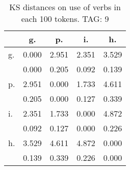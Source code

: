 \begin{table}[h!]
\begin{center}
\begin{tabular}{| l | c | c | c | c |}\hline
 & g. & p. & i. & h. \\\hline
g. & 0.000  & 2.951  & 2.351  & 3.529 \\\hline
 & 0.000  & 0.205  & 0.092  & 0.139 \\\hline
p. & 2.951  & 0.000  & 1.733  & 4.611 \\\hline
 & 0.205  & 0.000  & 0.127  & 0.339 \\\hline
i. & 2.351  & 1.733  & 0.000  & 4.872 \\\hline
 & 0.092  & 0.127  & 0.000  & 0.226 \\\hline
h. & 3.529  & 4.611  & 4.872  & 0.000 \\\hline
 & 0.139  & 0.339  & 0.226  & 0.000 \\\hline
\end{tabular}
\caption{KS distances on use of verbs in each 100 tokens. TAG: 9}
\end{center}
\end{table}